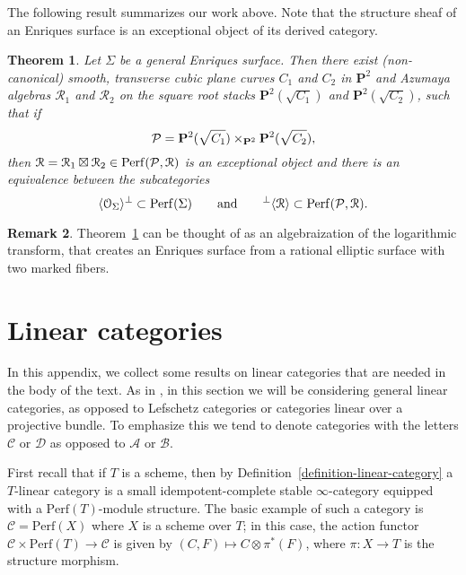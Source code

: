 \documentclass[11pt, reqno]{amsart}
\numberwithin{equation}{section}
\theoremstyle{plain}
\newtheorem{theorem}{Theorem}[section]
\theoremstyle{definition}
\newtheorem{remark}[theorem]{Remark}
\newcommand{\Perf}{\mathrm{Perf}}
\newcommand{\cO}{\mathcal{O}}
\newcommand{\cA}{\mathcal{A}}
\newcommand{\cB}{\mathcal{B}}
\newcommand{\cC}{\mathcal{C}}
\newcommand{\cD}{\mathcal{D}}
\newcommand{\cR}{\mathcal{R}}
\newcommand{\ccP}{\CMcal{P}}
\newcommand{\bP}{\mathbf{P}}
\begin{document}
The following result summarizes our work above. 
Note that the structure sheaf of an Enriques surface is an exceptional object of its
derived category. 

\begin{theorem} 
\label{theorem-enriques} 
Let $\Sigma$ be a general Enriques surface. 
Then there exist \textup(non-canonical\textup) smooth, transverse cubic plane curves $C_1$ and $C_2$ in $\bP^2$ 
and Azumaya algebras $\cR_1$ and $\cR_2$ on the square root stacks $\bP^2(\sqrt{C_1})$ and $\bP^2(\sqrt{C_2})$, 
such that if 
\begin{equation*}
\ccP = \bP^2(\sqrt{C_1}) \times_{\bP^2} \bP^2(\sqrt{C_2}), 
\end{equation*} 
then $\cR = \cR_1 \boxtimes \cR_2 \in \Perf(\ccP, \cR)$ is an exceptional object and there is 
an equivalence between the subcategories 
\begin{equation*}
\langle \cO_{\Sigma} \rangle^{\perp} \subset \Perf(\Sigma) 
\qquad \text{and} \qquad 
{^{\perp}}\langle \cR \rangle \subset \Perf(\ccP, \cR). 
\end{equation*} 
\end{theorem}

\begin{remark}
Theorem~\ref{theorem-enriques} can be thought of as an algebraization of the logarithmic transform, that creates an 
Enriques surface from a rational elliptic surface with two marked fibers. 
\end{remark}



\appendix

\section{Linear categories} 
\label{section:linear-cats}

In this appendix, we collect some results on linear categories that 
are needed in the body of the text. 
As in \cite[Part I]{NCHPD}, in this section we will be considering general linear categories, 
as opposed to Lefschetz categories or categories linear over a projective bundle.  
To emphasize this we tend to denote categories with the letters 
$\cC$ or $\cD$ as opposed to $\cA$ or $\cB$. 

First recall that if $T$ is a scheme, then by Definition~\ref{definition-linear-category} a 
$T$-linear category is a small idempotent-complete stable $\infty$-category equipped with a $\Perf(T)$-module structure. 
The basic example of such a category is $\cC = \Perf(X)$ where $X$ is a scheme over $T$; 
in this case, the action functor $\cC \times \Perf(T) \to \cC$ is given by $(C, F) \mapsto C \otimes \pi^*(F)$, 
where $\pi \colon X \to T$ is the structure morphism.
\end{document}
